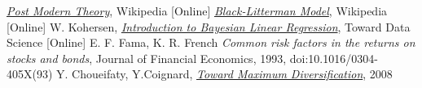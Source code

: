 \begin{thebibliography}{9}
\href{https://en.wikipedia.org/wiki/Post-modern_portfolio_theory}{\emph{Post Modern Theory}}, Wikipedia [Online]
\href{https://en.wikipedia.org/wiki/Black\%E2\%80\%93Litterman_model}{\emph{Black-Litterman Model}}, Wikipedia [Online]
W. Kohersen, \href{https://towardsdatascience.com/introduction-to-bayesian-linear-regression-e66e60791ea7}{\emph{Introduction to Bayesian Linear Regression}}, Toward Data Science [Online]
 E. F. Fama, K. R. French \emph{Common risk factors in the returns on stocks and bonds}, Journal of Financial Economics, 1993, doi:10.1016/0304-405X(93)
 Y. Choueifaty, Y.Coignard, \href{ https://www.tobam.fr/wp-content/uploads/2014/12/TOBAM-JoPM-Maximum-Div-2008.pdf}{\emph{Toward Maximum Diversification}}, 2008
\end{thebibliography}